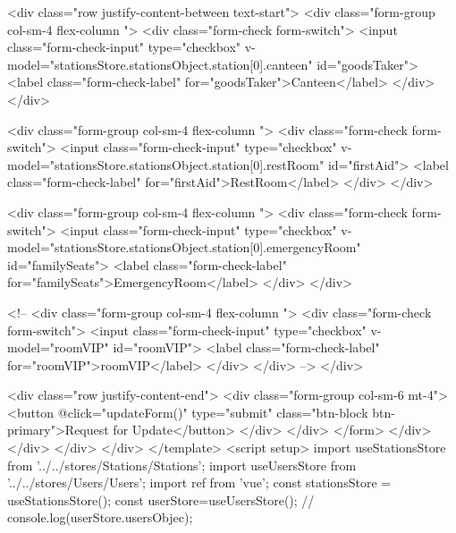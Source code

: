                         <div class="row justify-content-between text-start">
                            <div class="form-group col-sm-4 flex-column ">
                                <div class="form-check form-switch">
                                    <input class="form-check-input" type="checkbox" v-model="stationsStore.stationsObject.station[0].canteen" id="goodsTaker">
                                    <label class="form-check-label" for="goodsTaker">Canteen</label>
                                </div>
                            </div>

                            <div class="form-group col-sm-4 flex-column ">
                                <div class="form-check form-switch">
                                    <input class="form-check-input" type="checkbox" v-model="stationsStore.stationsObject.station[0].restRoom" id="firstAid">
                                    <label class="form-check-label" for="firstAid">RestRoom</label>
                                </div>
                            </div>

                            <div class="form-group col-sm-4 flex-column ">
                                <div class="form-check form-switch">
                                    <input class="form-check-input" type="checkbox" v-model="stationsStore.stationsObject.station[0].emergencyRoom" id="familySeats">
                                    <label class="form-check-label" for="familySeats">EmergencyRoom</label>
                                </div>
                            </div>

                            <!-- <div class="form-group col-sm-4 flex-column ">
                                <div class="form-check form-switch">
                                    <input class="form-check-input" type="checkbox" v-model="roomVIP" id="roomVIP">
                                    <label class="form-check-label" for="roomVIP">roomVIP</label>
                                </div>
                            </div> -->
                        </div>

                        <div class="row justify-content-end">
                            <div class="form-group col-sm-6 mt-4"> <button @click="updateForm()" type="submit" class="btn-block btn-primary">Request for
                                    Update</button> </div>
                        </div>
                    </form>
                </div>
            </div>
        </div>
    </div>
</template>
<script setup>
import { useStationsStore } from '../../stores/Stations/Stations';
import { useUsersStore } from '../../stores/Users/Users';
import { ref } from 'vue';
const stationsStore = useStationsStore();
const userStore=useUsersStore();
// console.log(userStore.usersObjec);

